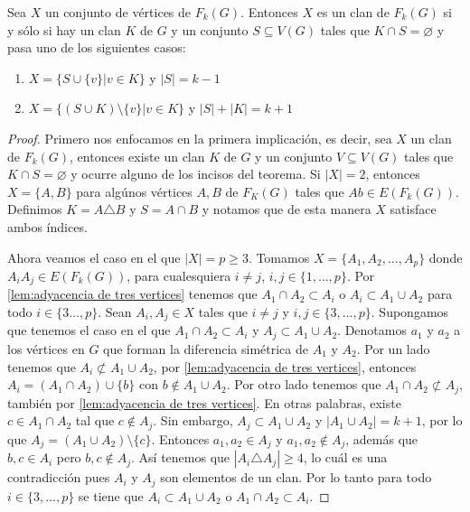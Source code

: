     \begin{teorema}
    \label{teo:relacion clan en G y F(G)}
        Sea $X$ un conjunto de v\'ertices de $F_k(G)$. Entonces $X$ es un clan
        de $F_k(G)$ si y s\'olo si hay un clan $K$ de $G$ y un conjunto $S
        \subseteq V(G)$ tales que $K \cap S = \varnothing$ y pasa uno de los
        siguientes casos:
        \begin{enumerate}
            \item $X = \{S \cup \{v\}| v \in K\}$ y $|S| = k-1$
            \item $X = \{(S\cup K) \setminus \{v\}| v \in K \}$ y $|S| + |K| =
            k+1$
        \end{enumerate}
    \end{teorema}

    \begin{proof}
        Primero nos enfocamos en la primera implicaci\'on, es decir, sea $X$ un
        clan de $F_k(G)$, entonces existe un clan $K$ de $G$ y un conjunto $V
        \subseteq V(G)$ tales que $K \cap S = \varnothing$ y ocurre alguno de
        los incisos del teorema. Si $|X|=2$, entonces $X= \{A, B\}$ para
        alg\'unos v\'ertices $A, B$ de $F_K(G)$ tales que $Ab \in E(F_k(G))$.
        Definimos $K = A \triangle B$ y $S=A \cap B$ y notamos que de esta
        manera $X$ satisface ambos \'indices.

        Ahora veamos el caso en el que $|X|= p \geq 3$. Tomamos $X=\{A_1, A_2,
        \dots, A_p\}$ donde $A_i{A_j} \in E(F_k(G))$, para cualesquiera $i\neq j$,
        $i,j \in \{1, \dots, p\}$. Por \cref{lem:adyacencia de tres vertices}
        tenemos que $A_1\cap A_2 \subset A_i$ o $A_i \subset A_1 \cup A_2$ para
        todo $i \in \{3 \dots,p \}$. Sean $A_i, A_j \in X$ tales que $i \neq j$
        y $i, j \in \{3, \dots, p\}$. Supongamos que tenemos el caso en el que
        $A_1\cap A_2 \subset A_i$ y $A_j \subset A_1 \cup A_2$. Denotamos $a_1$
        y $a_2$ a los v\'ertices en $G$ que forman la diferencia sim\'etrica de
        $A_1$ y $A_2$. Por un lado tenemos que $A_i \not\subset A_1\cup A_2$,
        por \cref{lem:adyacencia de tres vertices}, entonces $A_i = (A_1\cap
        A_2) \cup \{b\}$ con $b \notin A_1\cup A_2$. Por otro lado tenemos que
        $A_1 \cap A_2 \not\subset A_j$, tambi\'en por \cref{lem:adyacencia de
        tres vertices}. En otras palabras, existe $c \in A_1 \cap A_2$ tal que
        $c \notin A_j$. Sin embargo, $A_j \subset A_1 \cup A_2$ y $|A_1 \cup
        A_2| =k+1$, por lo que $A_j = (A_1 \cup A_2)\setminus \{c\}$. Entonces
        $a_1, a_2 \in A_j$ y $a_1, a_2 \notin A_j$, adem\'as que $b, c \in A_i$
        pero $b, c \notin A_j$. As\'i tenemos que $|A_i \triangle A_j| \geq 4$,
        lo cu\'al es una contradicci\'on pues $A_i$ y $A_j$ son elementos de un
        clan. Por lo tanto para todo $i\in \{3, \dots, p\}$ se tiene que $A_i
        \subset A_1\cup A_2$ o $A_1 \cap A_2 \subset A_i$.


\end{proof}
